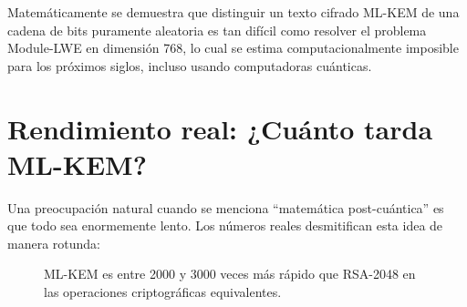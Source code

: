 Matemáticamente se demuestra que distinguir un texto cifrado ML-KEM de una cadena de bits puramente aleatoria es tan difícil como resolver el problema Module-LWE en dimensión 768, lo cual se estima computacionalmente imposible para los próximos siglos, incluso usando computadoras cuánticas.

\section{Rendimiento real: ¿Cuánto tarda ML-KEM?}

Una preocupación natural cuando se menciona ``matemática post-cuántica'' es que todo sea enormemente lento. Los números reales desmitifican esta idea de manera rotunda:

\begin{figure}[htbp]
\centering
{}
\caption{ML-KEM es entre 2000 y 3000 veces más rápido que RSA-2048 en las operaciones criptográficas equivalentes.}
\label{fig:rendimiento_kem}
\end{figure}

